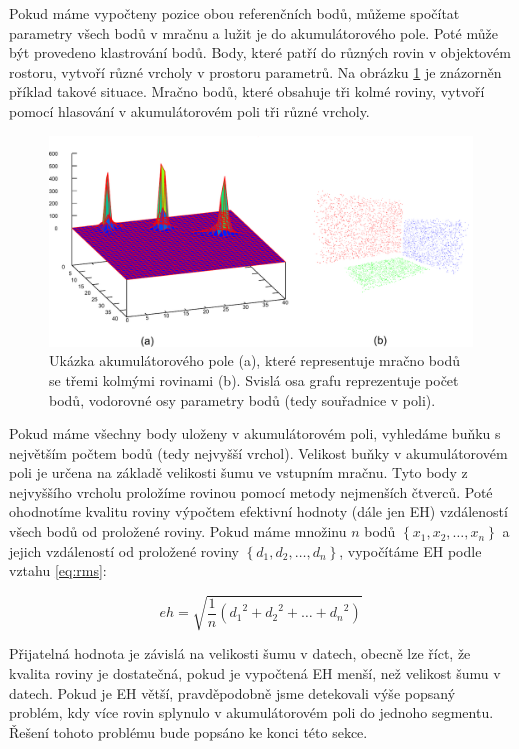 \documentclass[11pt,twoside,a4paper]{book}
\begin{document}
Pokud máme vypočteny pozice obou referenčních bodů, můžeme spočítat parametry všech bodů v mračnu a lužit je do akumulátorového pole. Poté může být provedeno klastrování bodů. Body, které patří do různých rovin v objektovém rostoru, vytvoří různé vrcholy v prostoru parametrů. Na obrázku \ref{fig:acc-pole} je znázorněn příklad takové situace. Mračno bodů, které obsahuje tři kolmé roviny, vytvoří pomocí hlasování v akumulátorovém poli tři různé vrcholy.

\begin{figure}[ht]
\begin{center}
\includegraphics[width=\textwidth]{figures/ac-pole}
\caption{Ukázka akumulátorového pole (a), které representuje mračno bodů se třemi kolmými rovinami (b). Svislá osa grafu reprezentuje počet bodů, vodorovné osy parametry bodů (tedy souřadnice v poli).}
\label{fig:acc-pole}
\end{center}
\end{figure}

Pokud máme všechny body uloženy v akumulátorovém poli, vyhledáme buňku s největším počtem bodů (tedy nejvyšší vrchol). Velikost buňky v akumulátorovém poli je určena na základě velikosti šumu ve vstupním mračnu. Tyto body z nejvyššího vrcholu proložíme rovinou pomocí metody nejmenších čtverců. Poté ohodnotíme kvalitu roviny výpočtem efektivní hodnoty (dále jen EH) vzdáleností všech bodů od proložené roviny. Pokud máme množinu $n$ bodů $\left\{x_1, x_2, \ldots , x_n\right\}$ a jejich vzdáleností od proložené roviny $\left\{d_1, d_2, \ldots , d_n\right\}$, vypočítáme EH podle vztahu \ref{eq:rms}:

\begin{equation} 
\label{eq:rms}
eh = \sqrt{
\frac{1}{n}\left({d_1}^2 + {d_2}^2 + \ldots + {d_n}^2\right)
}
\end{equation}

Přijatelná hodnota je závislá na velikosti šumu v datech, obecně lze říct, že kvalita roviny je dostatečná, pokud je vypočtená EH menší, než velikost šumu v datech. Pokud je EH větší, pravděpodobně jsme detekovali výše popsaný problém, kdy více rovin splynulo v akumulátorovém poli do jednoho segmentu. Řešení tohoto problému bude popsáno ke konci této sekce.
\end{document}

